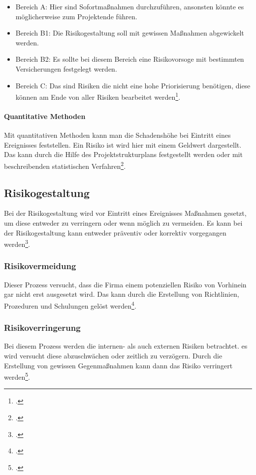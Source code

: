 \begin{itemize}
	\item Bereich A: Hier sind Sofortmaßnahmen durchzuführen, ansonsten könnte es möglicherweise zum Projektende führen.
	\item Bereich B1: Die Risikogestaltung soll mit gewissen Maßnahmen abgewickelt werden.
	\item Bereich B2: Es sollte bei diesem Bereich eine Risikovorsoge mit bestimmten Versicherungen festgelegt werden.
	\item Bereich C: Das sind Risiken die nicht eine hohe Priorisierung benötigen, diese können am Ende von aller Risiken bearbeitet werden\footcite{risikomanagement-diplomarbeit}.
\end{itemize}

\paragraph{Quantitative Methoden}
Mit quantitativen Methoden kann man die Schadenshöhe bei Eintritt eines Ereignisses feststellen. Ein Risiko ist wird hier mit einem Geldwert dargestellt.
Das kann durch die Hilfe des Projektstrukturplans festgestellt werden oder mit beschreibenden statistischen Verfahren\footcite{risikomanagement-diplomarbeit}.

\subsection{Risikogestaltung}
Bei der Risikogestaltung wird vor Eintritt eines Ereignisses Maßnahmen gesetzt, um diese entweder zu verringern oder wenn möglich zu vermeiden.
Es kann bei der Risikogestaltung kann entweder präventiv oder korrektiv vorgegangen werden\footcite{risikomanagement-diplomarbeit}.

\subsubsection{Risikovermeidung}
Dieser Prozess versucht, dass die Firma einem potenziellen Risiko von Vorhinein gar nicht erst ausgesetzt wird. Das kann durch die Erstellung von Richtlinien, Prozeduren und Schulungen gelöst werden\footcite{risikomanagement-diplomarbeit}.

\subsubsection{Risikoverringerung}
Bei diesem Prozess werden die internen- als auch externen Risiken betrachtet. es wird versucht diese abzuschwächen oder zeitlich zu verzögern. Durch die Erstellung von gewissen Gegenmaßnahmen kann dann das Risiko verringert werden\footcite{risikomanagement-diplomarbeit}.

